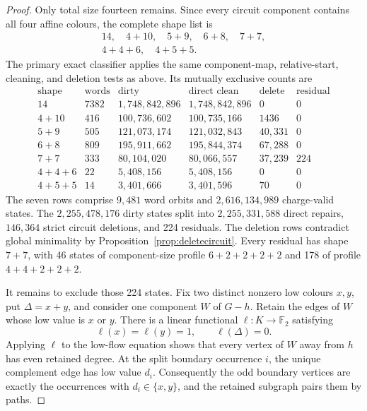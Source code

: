 \documentclass[11pt]{article}
\theoremstyle{definition}
\theoremstyle{remark}
\newcommand{\F}{\mathbb F}
\begin{document}
\begin{proof}
Only total size fourteen remains.  Since every circuit component contains
all four affine colours, the complete shape list is
\[
\begin{gathered}
14,\quad4+10,\quad5+9,\quad6+8,\quad7+7,\\
4+4+6,\quad4+5+5.                                      \tag{22}
\end{gathered}
\]
The primary exact classifier applies the same component-map, relative-start,
cleaning, and deletion tests as above.  Its mutually exclusive counts are
\[
\begin{array}{c|r|r|r|r|r}
\text{shape}&\text{words}&\text{dirty}&\text{direct clean}&
\text{delete}&\text{residual}\\
\hline
14&7382&1{,}748{,}842{,}896&1{,}748{,}842{,}896&0&0\\
4+10&416&100{,}736{,}602&100{,}735{,}166&1436&0\\
5+9&505&121{,}073{,}174&121{,}032{,}843&40{,}331&0\\
6+8&809&195{,}911{,}662&195{,}844{,}374&67{,}288&0\\
7+7&333&80{,}104{,}020&80{,}066{,}557&37{,}239&224\\
4+4+6&22&5{,}408{,}156&5{,}408{,}156&0&0\\
4+5+5&14&3{,}401{,}666&3{,}401{,}596&70&0
\end{array}                                             \tag{23}
\]
The seven rows comprise \(9{,}481\) word orbits and
\(2{,}616{,}134{,}989\) charge-valid states.  The
\(2{,}255{,}478{,}176\) dirty states split into
\(2{,}255{,}331{,}588\) direct repairs, \(146{,}364\) strict
circuit deletions, and 224 residuals.  The deletion rows contradict
global minimality by Proposition~\ref{prop:deletecircuit}.  Every residual
has shape \(7+7\), with 46 states of component-size profile
\(6+2+2+2+2\) and 178 of profile \(4+4+2+2+2\).

It remains to exclude those 224 states.  Fix two distinct nonzero low
colours \(x,y\), put \(\Delta=x+y\), and consider one component \(W\)
of \(G-h\).  Retain the edges of \(W\) whose low value is \(x\) or \(y\).
There is a linear functional \(\ell:K\to\F_2\) satisfying
\[
                 \ell(x)=\ell(y)=1,\qquad\ell(\Delta)=0. \tag{24}
\]
Applying \(\ell\) to the low-flow equation shows that every vertex of
\(W\) away from \(h\) has even retained degree.  At the split boundary
occurrence \(i\), the unique complement edge has low value \(d_i\).
Consequently the odd boundary vertices are exactly the occurrences with
\(d_i\in\{x,y\}\), and the retained subgraph pairs them by paths.


\end{proof}
\end{document}
